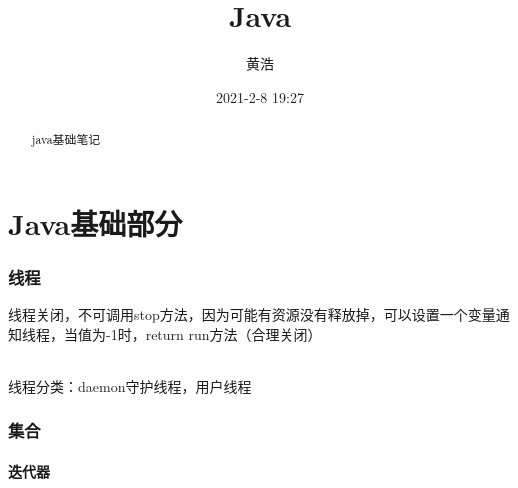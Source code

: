 \documentclass[12pt]{ctexart}
\begin{document}
\title{Java}
\author{黄浩}
\date{2021-2-8 19:27}
\maketitle
\tableofcontents
\part{Java基础部分}
\begin{abstract}
    java基础笔记
\end{abstract}
\section{线程}
线程关闭，不可调用stop方法，因为可能有资源没有释放掉，可以设置一个变量通知线程，当值为-1时，return run方法（合理关闭）
\paragraph{}{\kaishu 线程分类：daemon守护线程，用户线程}
\section{集合}
\subsection{迭代器}
\end{document}
